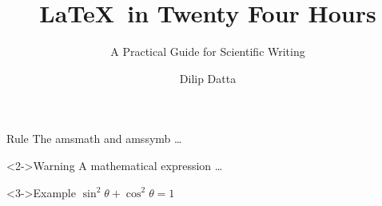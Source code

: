 \documentclass{beamer}
\title[\LaTeX\ in 24H]{\LaTeX\ in Twenty Four Hours}
\subtitle{A Practical Guide for Scientific Writing}
\author[D. Datta]{Dilip Datta}
\begin{document}
    \begin{frame}[t]
        \begin{block}{Rule\newline}
            The amsmath and amssymb …
        \end{block}
        \begin{alertblock}<2->{Warning} %
        A mathematical expression …
        \end{alertblock}
        \begin{exampleblock}<3->{Example}
        $\sin^2\theta + \cos^2\theta = 1$
        \end{exampleblock}
    \end{frame}
\end{document}
